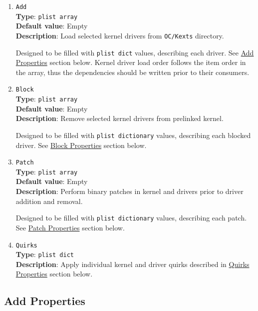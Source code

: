\documentclass[]{article}
\begin{document}
\begin{enumerate}
\item
  \texttt{Add}\\
  \textbf{Type}: \texttt{plist\ array}\\
  \textbf{Default value}: Empty\\
  \textbf{Description}: Load selected kernel drivers from \texttt{OC/Kexts} directory.

  Designed to be filled with \texttt{plist\ dict} values, describing each driver.
  See \hyperref[kernelpropsadd]{Add Properties} section below. Kernel driver load
  order follows the item order in the array, thus the dependencies should be written
  prior to their consumers.

\item
  \texttt{Block}\\
  \textbf{Type}: \texttt{plist\ array}\\
  \textbf{Default value}: Empty\\
  \textbf{Description}: Remove selected kernel drivers from prelinked kernel.

  Designed to be filled with \texttt{plist\ dictionary} values, describing each
  blocked driver. See \hyperref[kernelpropsblock]{Block Properties} section below.

\item
  \texttt{Patch}\\
  \textbf{Type}: \texttt{plist\ array}\\
  \textbf{Default value}: Empty\\
  \textbf{Description}: Perform binary patches in kernel and drivers prior to
  driver addition and removal.

  Designed to be filled with \texttt{plist\ dictionary} values, describing each
  patch. See \hyperref[kernelpropspatch]{Patch Properties} section below.

\item
  \texttt{Quirks}\\
  \textbf{Type}: \texttt{plist\ dict}\\
  \textbf{Description}: Apply individual kernel and driver quirks described
  in \hyperref[kernelpropsquirks]{Quirks Properties} section below.

\end{enumerate}

\subsection{Add Properties}\label{kernelpropsadd}
\end{document}
